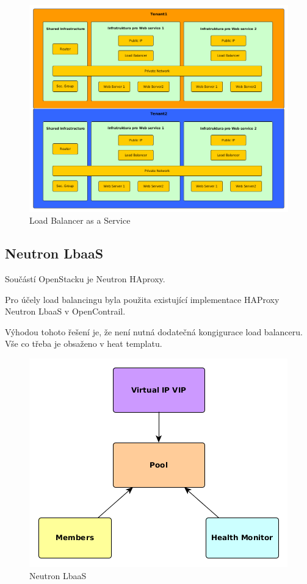 \begin{figure}[h]
\begin{centering}
\includegraphics[scale=0.43]{images/LoadBalancer}
\par\end{centering}
\caption{Load Balancer as a Service\label{fig:LoadBalancer}}
\end{figure}

\subsection{Neutron LbaaS}

Součástí OpenStacku je Neutron HAproxy. 

Pro účely load balancingu byla použita existující implementace HAProxy Neutron LbaaS v OpenContrail.

Výhodou tohoto řešení je, že není nutná dodatečná kongigurace load balanceru. Vše co třeba je obsaženo v heat templatu.

\begin{figure}[h]
\begin{centering}
\includegraphics[scale=0.63]{images/NeutronLbaaS}
\par\end{centering}
\caption{Neutron LbaaS\label{fig:NeutronLbaaS}}
\end{figure}


